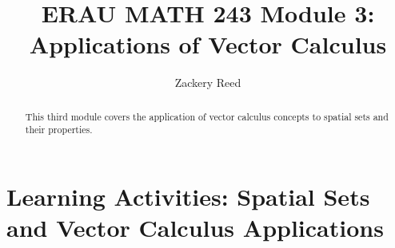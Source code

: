 \documentclass{xourse}
\title{ERAU MATH 243 Module 3: Applications of Vector Calculus}
\author{Zackery Reed}
\begin{document}
\begin{abstract}
This third module covers the application of vector calculus concepts to spatial sets and their properties.
\end{abstract}
\maketitle

\part{Learning Activities: Spatial Sets and Vector Calculus Applications}
\sectionstyle


\end{document}
